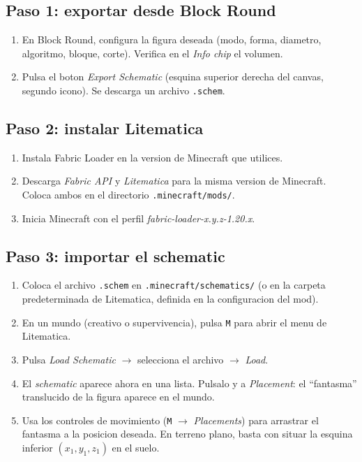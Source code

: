 \documentclass[12pt,a4paper]{scrartcl}
\begin{document}
\subsection{Paso 1: exportar desde Block Round}
\begin{enumerate}[leftmargin=1.5em,itemsep=0.15em,topsep=0.3em]
  \item En Block Round, configura la figura deseada (modo, forma, diametro, algoritmo, bloque, corte). Verifica en el \emph{Info chip} el volumen.
  \item Pulsa el boton \emph{Export Schematic} (esquina superior derecha del canvas, segundo icono). Se descarga un archivo \texttt{.schem}.
\end{enumerate}

\subsection{Paso 2: instalar Litematica}
\begin{enumerate}[leftmargin=1.5em,itemsep=0.15em,topsep=0.3em]
  \item Instala Fabric Loader en la version de Minecraft que utilices.
  \item Descarga \emph{Fabric API} y \emph{Litematica} para la misma version de Minecraft. Coloca ambos en el directorio \texttt{.minecraft/mods/}.
  \item Inicia Minecraft con el perfil \emph{fabric-loader-x.y.z-1.20.x}.
\end{enumerate}

\subsection{Paso 3: importar el schematic}
\begin{enumerate}[leftmargin=1.5em,itemsep=0.15em,topsep=0.3em]
  \item Coloca el archivo \texttt{.schem} en \texttt{.minecraft/schematics/} (o en la carpeta predeterminada de Litematica, definida en la configuracion del mod).
  \item En un mundo (creativo o supervivencia), pulsa \texttt{M} para abrir el menu de Litematica.
  \item Pulsa \emph{Load Schematic} $\rightarrow$ selecciona el archivo $\rightarrow$ \emph{Load}.
  \item El \emph{schematic} aparece ahora en una lista. Pulsalo y a \emph{Placement}: el \enquote{fantasma} translucido de la figura aparece en el mundo.
  \item Usa los controles de movimiento (\texttt{M} $\rightarrow$ \emph{Placements}) para arrastrar el fantasma a la posicion deseada. En terreno plano, basta con situar la esquina inferior $(x_1, y_1, z_1)$ en el suelo.
\end{enumerate}
\end{document}
